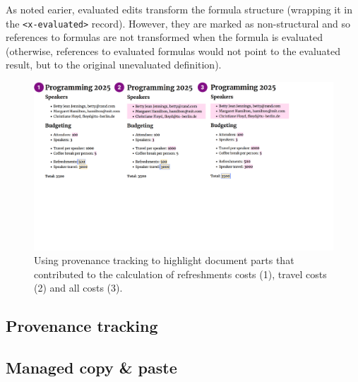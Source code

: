 \documentclass[sigconf,anonymous,screen]{acmart}
\begin{document}
As noted earier, evaluated edits transform the formula structure (wrapping it in the
{\small\Verb_<x-evaluated>_} record). However, they are marked as non-structural and so
references to formulas are not transformed when the formula is evaluated (otherwise, references
to evaluated formulas would not point to the evaluated result, but to the original unevaluated
definition).


\begin{figure}[t]
\includegraphics[width=1\columnwidth,clip,trim=0cm 8cm 5cm 0cm]{fig/provenance.pdf}
\vspace{-1em}
\caption{Using provenance tracking to highlight document parts that contributed to the
calculation of refreshments costs (1), travel costs (2) and all costs (3).}
\label{fig:provenance}
\vspace{-0.5em}
\end{figure}

\newpage


\subsection{Provenance tracking}
\label{sec:impl-provenance}

\subsection{Managed copy \& paste}
\label{sec:impl-copy}

\end{document}
